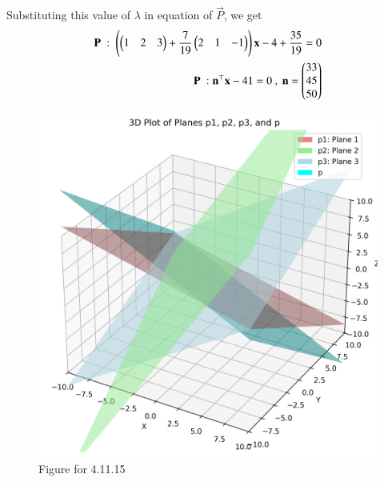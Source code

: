 \documentclass[journal,12pt,onecolumn]{IEEEtran}
\theoremstyle{remark}
\begin{document}
Substituting this value of $\lambda$ in equation of $\vec{P}$, we get
\begin{align}
    \mathbf{P}\ :\ \left(\begin{pmatrix}1 & 2 & 3 \end{pmatrix} + \frac{7}{19}\begin{pmatrix}2 & 1 & -1 \end{pmatrix}\right)\mathbf{x} -4 + \frac{35}{19}=0\\
    \mathbf{P} \ : \mathbf{n}^{\top}\mathbf{x}-41=0 \ , \ \mathbf{n}=\begin{pmatrix}33 \\ 45 \\ 50\end{pmatrix}
\end{align}
\begin{figure}[H]
    \centering
    \includegraphics[width=1\columnwidth]{figs/1.png}
    \caption{Figure for 4.11.15}
    \label{fig:placeholder}
\end{figure}
\end{document}
